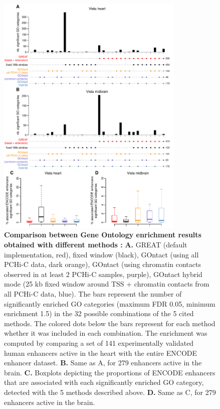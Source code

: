 \begin{figure}[hbt!]
 \centering
 \includegraphics[width=0.8\textwidth, page=1] {figures/GOntact/Figure4.pdf}
 \caption[Comparison between Gene Ontology enrichment results obtained with different methods]{
 \textbf{Comparison between Gene Ontology enrichment results obtained with different methods :}
 \textbf{A.} GREAT (default implementation, red), fixed window (black), GOntact (using all PCHi-C data, dark orange), GOntact (using chromatin contacts observed in at least 2 PCHi-C samples, purple), GOntact hybrid mode (25 kb fixed window around TSS + chromatin contacts from all PCHi-C data, blue). The bars represent the number of significantly enriched GO categories (maximum FDR 0.05, minimum enrichment 1.5) in the 32 possible combinations of the 5 cited methods. The colored dots below the bars represent for each method whether it was included in each combination. The enrichment was computed by comparing a set of 141 experimentally validated human enhancers active in the heart with the entire ENCODE enhancer dataset. 
 \textbf{B.} Same as A, for 279 enhancers active in the brain. 
 \textbf{C.} Boxplots depicting the proportions of ENCODE enhancers that are associated with each significantly enriched GO category, detected with the 5 methods described above. 
 \textbf{D.} Same as C, for 279 enhancers active in the brain. 
 \\
 }
 \label{fig:GOntact-fig4}
\end{figure} 

